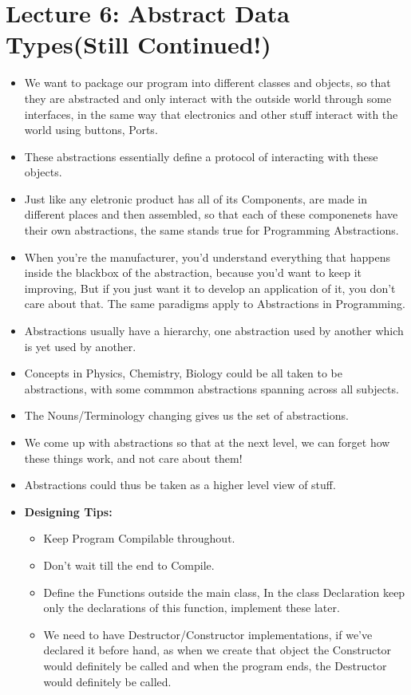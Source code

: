 \documentclass{article}
\begin{document}
\section{Lecture 6: Abstract Data Types(Still Continued!)}
\begin{itemize}
  \item We want to package our program into different classes and objects, so that they are abstracted and only interact with the outside world through some interfaces, in the same way that electronics and other stuff interact with the world using buttons, Ports.
  \item These abstractions essentially define a protocol of interacting with these objects.
  \item Just like any eletronic product has all of its Components, are made in different places and then assembled, so that each of these componenets have their own abstractions, the same stands true for Programming Abstractions.
  \item When you're the manufacturer, you'd understand everything that happens inside the blackbox of the abstraction, because you'd want to keep it improving, But if you just want it to develop an application of it, you don't care about that. The same paradigms apply to Abstractions in Programming.
  \item Abstractions usually have a hierarchy, one abstraction used by another which is yet used by another.
  \item Concepts in Physics, Chemistry, Biology could be all taken to be abstractions, with some commmon abstractions spanning across all subjects.
  \item The Nouns/Terminology changing gives us the set of abstractions.
  \item We come up with abstractions so that at the next level, we can forget how these things work, and not care about them!
  \item Abstractions could thus be taken as a higher level view of stuff.
  \item \textbf{Designing Tips:}
  \begin{itemize}
    \item Keep Program Compilable throughout.
    \item Don't wait till the end to Compile.
    \item Define the Functions outside the main class, In the class Declaration keep only the declarations of this function, implement these later.
    \item We need to have Destructor/Constructor implementations, if we've declared it before hand, as when we create that object the Constructor would definitely be called and when the program ends, the Destructor would definitely be called.
  \end{itemize}

\end{itemize}
\end{document}
